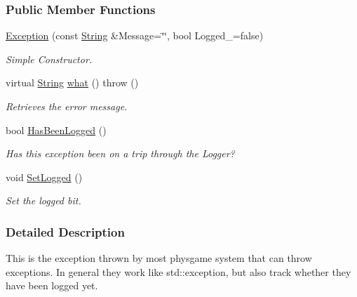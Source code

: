 \subsubsection*{Public Member Functions}
\begin{DoxyCompactItemize}
\item 
\hyperlink{classphys_1_1Exception_a274184178b7e7589bf1dcde1643924c1}{Exception} (const \hyperlink{namespacephys_aa03900411993de7fbfec4789bc1d392e}{String} \&Message=\char`\"{}\char`\"{}, bool Logged\_\-=false)
\begin{DoxyCompactList}\small\item\em Simple Constructor. \item\end{DoxyCompactList}\item 
virtual \hyperlink{namespacephys_aa03900411993de7fbfec4789bc1d392e}{String} \hyperlink{classphys_1_1Exception_ac929f9b3929526eec6e6b581c9a9dd73}{what} ()  throw ()
\begin{DoxyCompactList}\small\item\em Retrieves the error message. \item\end{DoxyCompactList}\item 
bool \hyperlink{classphys_1_1Exception_ab1399e25435c390db551855fda338951}{HasBeenLogged} ()
\begin{DoxyCompactList}\small\item\em Has this exception been on a trip through the Logger? \item\end{DoxyCompactList}\item 
\hypertarget{classphys_1_1Exception_a48ea61816b826d9b10dd43b76b6c7143}{
void \hyperlink{classphys_1_1Exception_a48ea61816b826d9b10dd43b76b6c7143}{SetLogged} ()}
\label{dc/d47/classphys_1_1Exception_a48ea61816b826d9b10dd43b76b6c7143}

\begin{DoxyCompactList}\small\item\em Set the logged bit. \item\end{DoxyCompactList}\end{DoxyCompactItemize}


\subsubsection{Detailed Description}
This is the exception thrown by most physgame system that can throw exceptions. In general they work like std::exception, but also track whether they have been logged yet. 

